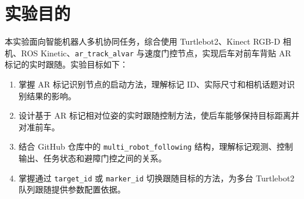 \section{实验目的}
本实验面向智能机器人多机协同任务，综合使用 Turtlebot2、Kinect RGB-D 相机、ROS Kinetic、\texttt{ar\_track\_alvar} 与速度门控节点，实现后车对前车背贴 AR 标记的实时跟随。实验目标如下：
\begin{enumerate}
	\item 掌握 AR 标记识别节点的启动方法，理解标记 ID、实际尺寸和相机话题对识别结果的影响。
	\item 设计基于 AR 标记相对位姿的实时跟随控制方法，使后车能够保持目标距离并对准前车。
	\item 结合 GitHub 仓库中的 \texttt{multi\_robot\_following} 结构，理解标记观测、控制输出、任务状态和避障门控之间的关系。
	\item 掌握通过 \texttt{target\_id} 或 \texttt{marker\_id} 切换跟随目标的方法，为多台 Turtlebot2 队列跟随提供参数配置依据。
\end{enumerate}
